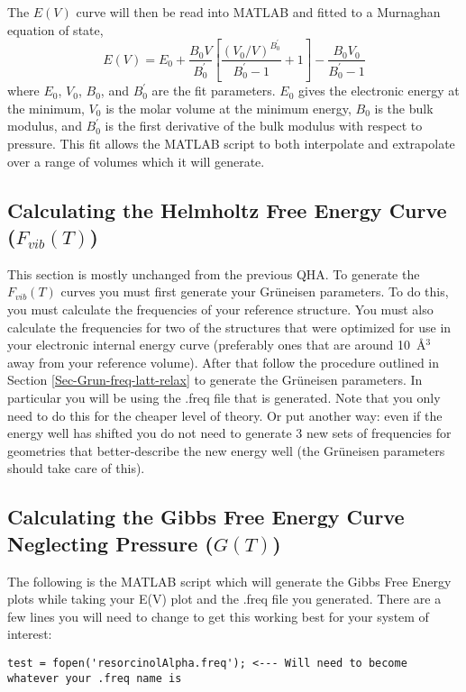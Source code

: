 \documentclass[11pt,letterpaper]{article}
\begin{document}
\begin{spacing}{1.0}
The $E(V)$ curve will then be read into MATLAB and fitted to a Murnaghan
equation of state,
\begin{equation}
E(V) = E_0 + \frac{B_0V}{B_0^\prime} \left[ \frac{\left(V_0/V\right)^{B_0^\prime}}{B_0^\prime -1} +1 \right] - \frac{B_0 V_0}{B_0^\prime -1} 
\end{equation}
where $E_0$, $V_0$, $B_0$, and $B_0^\prime$ are the fit parameters.
$E_0$ gives the electronic energy at the minimum, $V_0$ is the molar
volume at the minimum energy, $B_0$ is the bulk modulus, and
$B_0^\prime$ is the first derivative of the bulk modulus with respect
to pressure. This fit allows the MATLAB script to both interpolate and extrapolate over a range of volumes which it will generate.

\subsection{Calculating the Helmholtz Free Energy Curve ($F_{vib}(T)$)}

This section is mostly unchanged from the previous QHA. To generate the $F_{vib}(T)$ curves you must first generate your Gr\"{u}neisen parameters. To do this, you must calculate the frequencies of your reference structure. You must also calculate the frequencies for two of the structures that were optimized for use in your electronic internal energy curve (preferably ones that are around 10~\AA$^3$ away from your reference volume). After that follow the procedure outlined in Section \ref{Sec-Grun-freq-latt-relax} to generate the Gr\"{u}neisen parameters. In particular you will be using the .freq file that is generated. Note that you only need to do this for the cheaper level of theory. Or put another way: even if the energy well has shifted you do not need to generate 3 new sets of frequencies for geometries that better-describe the new energy well (the Gr\"{u}neisen parameters should take care of this).

\subsection{Calculating the Gibbs Free Energy Curve Neglecting Pressure ($G(T)$)}

The following is the MATLAB script which will generate the Gibbs Free Energy plots while taking your E(V) plot and the .freq file you generated. There are a few lines you will need to change to get this working best for your system of interest:

\begin{verbatim}
test = fopen('resorcinolAlpha.freq'); <--- Will need to become whatever your .freq name is


\end{verbatim}
\end{spacing}
\end{document}

